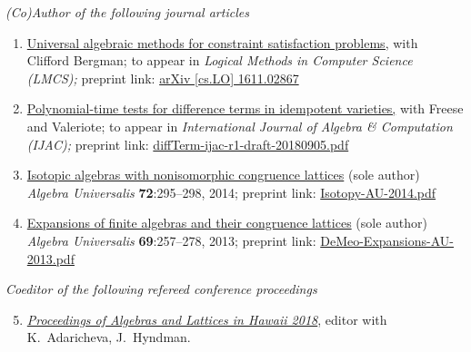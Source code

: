 \newcommand\mmskip{-6mm}

\renewcommand\pubitem[6]{\item \href{#5}{#1} #2 \textit{#3} #4 preprint link: \href{#5}{#6}}

    {\it (Co)Author of the following journal articles}%
    \begin{enumerate}
        \pubitem
        {Universal algebraic methods for constraint satisfaction problems,}
        {with Clifford Bergman; to appear in}
        {Logical Methods in Computer Science {\small (LMCS)};}
        {}
        {https://arxiv.org/abs/1611.02867}
        {arXiv [cs.LO] 1611.02867}
        
        \pubitem
      {Polynomial-time tests for difference terms in idempotent varieties,}
      {with Freese and Valeriote; to appear in}
      {International Journal of Algebra \& Computation {\small (IJAC)};}
      {}
      {https://github.com/UniversalAlgebra/term-conditions/blob/master/ijac/diffTerm-ijac-r1-draft-20180905.pdf}
      {diffTerm-ijac-r1-draft-20180905.pdf}
      
      \pubitem 
      {Isotopic algebras with nonisomorphic congruence lattices}
      {(sole author)}  %
      {Algebra Universalis}
      {\textbf{72}:295--298, 2014;} 
      {https://github.com/williamdemeo/Isotopy/blob/master/Isotopy-AU-2014.pdf}
      {Isotopy-AU-2014.pdf}
      
      
      \pubitem 
      {Expansions of finite algebras and their congruence lattices}
      {(sole author)}
      {Algebra Universalis}
      {\textbf{69}:257--278, 2013;}
      {https://github.com/williamdemeo/Overalgebras/blob/master/DeMeo-Expansions-AU-2013.pdf}
      {DeMeo-Expansions-AU-2013.pdf}

\end{enumerate}


    {\it Coeditor of the following refereed conference proceedings}
    \begin{enumerate}
      \setcounter{enumi}{4}

     \item \href{http://www.lulu.com/shop/kira-adaricheva-and-william-demeo-and-jennifer-hyndman/algebras-and-lattices-in-hawaii-honoring-ralph-freese-bill-lampe-and-jb-nation/paperback/product-23634583.html}{\it Proceedings of Algebras and Lattices in Hawaii 2018}, editor with K.~Adaricheva, J.~Hyndman.

    \end{enumerate}

